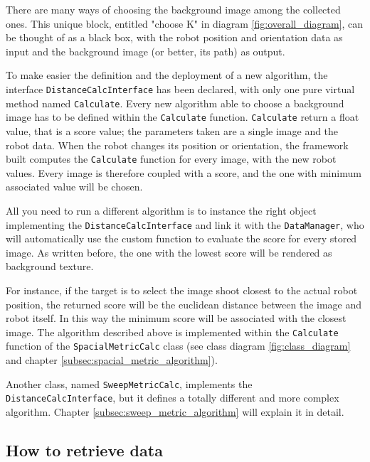 There are many ways of choosing the background image among the collected ones. This unique
block, entitled "choose K" in diagram \ref{fig:overall_diagram}, can be thought of as a
black box, with the robot position and orientation data as input and the background image
(or better, its path) as output.
%

%
To make easier the definition and the deployment of a new algorithm, the interface
\texttt{DistanceCalcInterface} has been declared, with only one pure virtual method named
\texttt{Calculate}. Every new algorithm able to choose a background image has to be defined
within the \texttt{Calculate} function.
\texttt{Calculate} return a float value, that is a score value; the parameters taken are a
single image and the robot data. When the robot changes its position or orientation, the
framework built computes the \texttt{Calculate} function for every image, with the new robot
values. Every image is therefore coupled with a score, and the one with minimum associated value
will be chosen.
%

%
All you need to run a different algorithm is to instance the right object implementing the
\texttt{DistanceCalcInterface} and link it with the \texttt{DataManager}, who will automatically
use the custom function to evaluate the score for every stored image. As written before, the
one with the lowest score will be rendered as background texture.
%

%
For instance, if the target is to select the image shoot closest to the actual robot position,
the returned score will be the euclidean distance between the image and robot itself. In this way
the minimum score will be associated with the closest image.
The algorithm described above is implemented within the \texttt{Calculate} function of the
\texttt{SpacialMetricCalc} class (see class diagram \ref{fig:class_diagram} and chapter
\ref{subsec:spacial_metric_algorithm}).
%

%
Another class, named \texttt{SweepMetricCalc}, implements the
\newline
\texttt{DistanceCalcInterface}, but it defines a totally different and more complex algorithm.
Chapter \ref{subsec:sweep_metric_algorithm} will explain it in detail.

\subsection{How to retrieve data}
\label{sub:howretrievedata}
